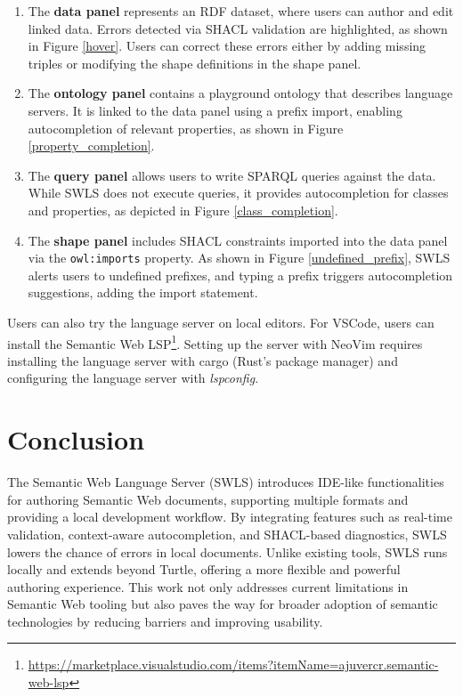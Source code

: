 \begin{enumerate}
  \item The \textbf{data panel} represents an RDF dataset, where users can author and edit linked data.
    Errors detected via SHACL validation are highlighted, as shown in Figure \ref{hover}.
    Users can correct these errors either by adding missing triples or modifying the shape definitions in the shape panel.
  \item The \textbf{ontology panel} contains a playground ontology that describes language servers.
    It is linked to the data panel using a prefix import, enabling autocompletion of relevant properties, as shown in Figure \ref{property_completion}.
  \item The \textbf{query panel} allows users to write SPARQL queries against the data. 
    While SWLS does not execute queries, it provides autocompletion for classes and properties, as depicted in Figure \ref{class_completion}.
  \item The \textbf{shape panel} includes SHACL constraints imported into the data panel via the \texttt{owl:imports} property. 
    As shown in Figure \ref{undefined_prefix}, SWLS alerts users to undefined prefixes, and typing a prefix triggers autocompletion suggestions, adding the import statement.
\end{enumerate}

Users can also try the language server on local editors.
For VSCode, users can install the Semantic Web LSP\footnote{\url{https://marketplace.visualstudio.com/items?itemName=ajuvercr.semantic-web-lsp}}.
Setting up the server with NeoVim requires installing the language server with cargo (Rust's package manager) and configuring the language server with \textit{lspconfig}.

\section{Conclusion}

The Semantic Web Language Server (SWLS) introduces IDE-like functionalities for authoring Semantic Web documents, supporting multiple formats and providing a local development workflow. 
By integrating features such as real-time validation, context-aware autocompletion, and SHACL-based diagnostics, SWLS lowers the chance of errors in local documents.
Unlike existing tools, SWLS runs locally and extends beyond Turtle, offering a more flexible and powerful authoring experience.
This work not only addresses current limitations in Semantic Web tooling but also paves the way for broader adoption of semantic technologies by reducing barriers and improving usability.


